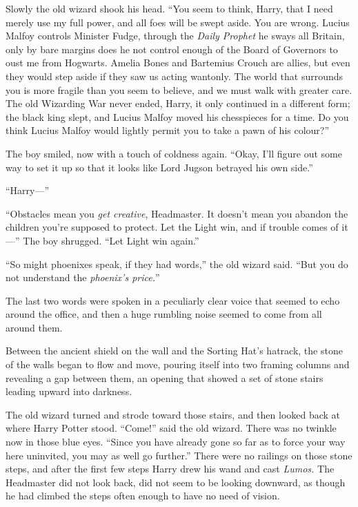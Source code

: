 Slowly the old wizard shook his head. “You seem to think, Harry, that I need
merely use my full power, and all foes will be swept aside. You are wrong.
Lucius Malfoy controls Minister Fudge, through the \emph{Daily Prophet} he
sways all Britain, only by bare margins does he not control enough of the Board
of Governors to oust me from Hogwarts. Amelia Bones and Bartemius Crouch are
allies, but even they would step aside if they saw us acting wantonly. The
world that surrounds you is more fragile than you seem to believe, and we must
walk with greater care. The old Wizarding War never ended, Harry, it only
continued in a different form; the black king slept, and Lucius Malfoy moved
his chesspieces for a time. Do you think Lucius Malfoy would lightly permit you
to take a pawn of his colour?”

The boy smiled, now with a touch of coldness again. “Okay, I’ll figure out some
way to set it up so that it looks like Lord Jugson betrayed his own side.”

“Harry—”

“Obstacles mean you \emph{get creative}, Headmaster. It doesn’t mean you
abandon the children you’re supposed to protect. Let the Light win, and if
trouble comes of it—” The boy shrugged. “Let Light win again.”

“So might phoenixes speak, if they had words,” the old wizard said. “But you do
not understand the \emph{phoenix’s price.}”

The last two words were spoken in a peculiarly clear voice that seemed to echo
around the office, and then a huge rumbling noise seemed to come from all
around them.

Between the ancient shield on the wall and the Sorting Hat’s hatrack, the stone
of the walls began to flow and move, pouring itself into two framing columns
and revealing a gap between them, an opening that showed a set of stone stairs
leading upward into darkness.

The old wizard turned and strode toward those stairs, and then looked back at
where Harry Potter stood. “Come!” said the old wizard. There was no twinkle now
in those blue eyes. “Since you have already gone so far as to force your way
here uninvited, you may as well go further.”
\later
There were no railings on those stone steps, and after the first few steps
Harry drew his wand and cast \emph{Lumos.} The Headmaster did not look back,
did not seem to be looking downward, as though he had climbed the steps often
enough to have no need of vision.

